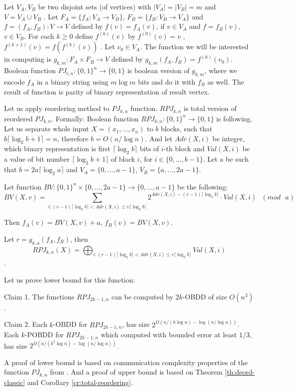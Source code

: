 \documentclass{llncs}
\begin{document}
 Let $V_A,V_B$ be two disjoint sets (of vertices) with $|V_A| = |V_B| = m$
and $V = V_A \cup V_B$ . Let $F_A = \{f_A : V_A \to V_B\}$, $F_B = \{f_B : V_B \to V_A\}$ and $f = (f_A, f_B):V \to V$ defined by $f(v) = f_A(v)$, if $v\in V_A$ and $f= f_B(v)$, $v\in V_B$. For each $k \geq 0$ define $f^{(k)}(v)$ by $f^{(0)}(v) = v$ , $f^{(k+1)}(v) = f(f^{(k)}(v))$ .
Let $v_0\in V_A$. The function we will be interested in computing is $g_{k,m} : F_A \times F_B \to V$ defined by $g_{k,m}(f_A, f_B) = f^{(k)}(v_0)$. Boolean function $PJ_{t,n}:\{0,1\}^n\to\{0,1\}$ is boolean version of $g_{k,m}$, where we encode $f_A$ in a binary string using $m\log m$ bits and do it with  $f_B$ as well. The result of function is parity of binary representation of result vertex.

Let us apply reordering method to $PJ_{k,n}$ function. $RPJ_{k,n}$ is total version of reordered $PJ_{k,n}$.
%
Formally:
Boolean function $RPJ_{k,n}:\{0,1\}^n\to\{0,1\}$ is following. Let us separate whole input $X=(x_1,\dots,x_n)$ to $b$ blocks, such that $b\lceil\log_2b+1\rceil = n$, therefore $b=O(n/\log n)$. 
And let $Adr(X,i)$ be integer, which binary representation is first $\lceil \log_2 b \rceil$ bits of $i$-th block and $Val(X,i)$ be a value of bit number $\lceil \log_2 b+1 \rceil$ of block $i$, for $i\in\{0,\dots,b-1\}$. Let $a$ be such that $b=2a\lceil\log_2 a\rceil$ and $V_A=\{0,\dots,a-1\}$, $V_B=\{a,\dots,2a-1\}$. 

Let function $BV:\{0,1\}^n\times\{0,\dots, 2a-1\}\to \{0,\dots, a-1\}$ be the following:
\[BV(X,v) = \sum_{i:(v-1)\lceil\log_2 b \rceil< Adr(X,i)\leq v\lceil\log_2 b \rceil}2^{Adr(X,i) - (v-1)\lceil\log_2 b \rceil}\cdot Val(X,i)\mbox{ }(mod\mbox{ }a)\]

Then $f_A(v)=BV(X,v)+a$, $f_B(v)=BV(X,v)$.

Let $r=g_{k,a}(f_A,f_B)$, then 
\[RPJ_{k,n}(X)=\bigoplus_{i:(r-1)\lceil\log_2 b \rceil < Adr(X,i)\leq r\lceil\log_2 b \rceil}Val(X,i)\]. 

Let us prove lower bound for this function:

\begin{lemma}\label{lm:dpj}

Claim 1. The functions $RPJ_{2k-1,n}$ can be computed by $2k$-OBDD of size $O(n^3)$.

Claim 2. Each $k$-OBDD for $RPJ_{2k-1,n}$, has size $2^{\Omega(n/(k\log n)-\log (n/\log n))}$. Each $k$-POBDD for $RPJ_{2k-1,n}$ which computed with bounded error at least $1/3$, has size $2^{\Omega( n/(k^3\log n)  - \log(n/\log n))}$.

\end{lemma}
A proof of lower bound is based on communication complexity properties of the function $PJ_{k,n}$ from \cite{nw91}. And a proof of upper bound is based on Theorem \ref{th:deord-classic} and Corollary \ref{cr:total-reordering}.
\end{document}
